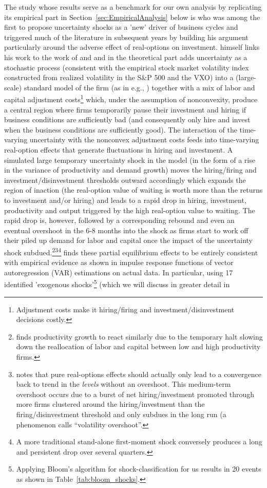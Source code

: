 \documentclass[a4paper,11pt,listof=nochaptergap,oneside,pointednumbers,bibtotoc,bigheadings,liststotoc]{scrbook}
\begin{document}
The study whose results serve as a benchmark for our own analysis by replicating its empirical part in Section~\ref{sec:EmpiricalAnalysis} below is \citet{bloom:09} who was among the first to propose uncertainty shocks as a 'new' driver of business cycles and triggered much of the literature in subsequent years by building his argument particularly around the adverse effect of real-options on investment. \citet{bloom:09} himself links his work to the work of \citet{bernanke:83} and \citet{hassler:96} and in the theoretical part adds uncertainty as a stochastic process (consistent with the empirical stock market volatility index constructed from realized volatility in the S\&P 500 and the VXO) into a (large-scale) standard model of the firm (as in e.g., \citealp{abelandeberly:96}) together with a mix of labor and capital adjustment costs\footnote{Adjustment costs make it hiring/firing and investment/disinvestment decisions costly.} which, under the assumption of nonconvexity, produce a central region where firms temporarily pause their investment and hiring if business conditions are sufficiently bad (and consequently only hire and invest when the business conditions are sufficiently good). The interaction of the time-varying uncertainty with the nonconvex adjustment costs feeds into time-varying real-option effects that generate fluctuations in hiring and investment. A simulated large temporary uncertainty shock in the model (in the form of a rise in the variance of productivity and demand growth) moves the hiring/firing and investment/disinvestment thresholds outward accordingly which expands the region of inaction (the real-option value of waiting is worth more than the returns to investment and/or hiring) and leads to a rapid drop in hiring, investment, productivity and output triggered by the high real-option value to waiting. The rapid drop is, however, followed by a corresponding rebound and even an eventual overshoot in the 6-8 months into the shock as firms start to work off their piled up demand for labor and capital once the impact of the uncertainty shock subdued.\footnote{\citet{bloom:09} finds productivity growth to react similarly due to the temporary halt slowing down the reallocation of labor and capital between low and high productivity firms.}\footnote{\citet[p. 646]{bloom:09} notes that pure real-options effects should actually only lead to a convergence back to trend in the \textit{levels} without an overshoot. This medium-term overshoot occurs due to a burst of net hiring/investment promoted through more firms clustered around the hiring/investment than the firing/disinvestment threshold and only subdues in the long run (a phenomenon \citet{bloom:09} calls ``volatility overshoot''.}\footnote{A more traditional stand-alone first-moment shock conversely produces a long and persistent drop over several quarters.} \citet{bloom:09} finds these partial equilibrium effects to be entirely consistent with empirical evidence as shown in impulse response functions of vector autoregression (VAR) estimations on actual data. In particular, using 17 identified 'exogenous shocks'\footnote{Applying Bloom's algorithm for shock-classification for us results in 20 events as shown in Table~\ref{tab:bloom_shocks}.} (which we will discuss in greater detail in 
\end{document}
